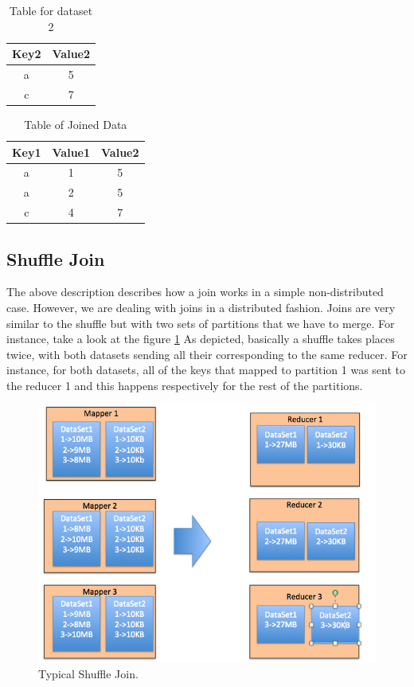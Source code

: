 \begin{table}[h!]
\centering
 \begin{tabular}{|c |c|}
  \hline
   Key2 & Value2 \\
  \hline
   a & 5 \\
  \hline
   c & 7 \\
  \hline
\end{tabular}
\caption{Table for dataset 2}
\label{table:join2}
\end{table}

\begin{table}[h!]
\centering
 \begin{tabular}{|c |c |c|}
  \hline
   Key1 & Value1 & Value2  \\
  \hline
   a & 1 & 5 \\
  \hline
   a & 2 & 5 \\
  \hline
   c & 4 & 7 \\
  \hline
\end{tabular}
\caption{Table of Joined Data}
\label{table:join3}
\end{table}

\subsection{Shuffle Join}
The above description describes how a join works in a simple non-distributed case. 
However, we are dealing with joins in a distributed fashion. Joins are very similar
to the shuffle but with two sets of partitions that we have to merge. 
For instance, take a look at the figure \ref{fig:shuffle_join}
As depicted, basically a shuffle takes places twice, with both datasets sending all their
corresponding to the same reducer. For instance, for both datasets, all of the keys that 
mapped to partition 1 was sent to the reducer 1 and this happens respectively for the rest of the partitions.

 \begin{figure}[h]
\begin{center}
\includegraphics[scale=1.0]{./img/shuffle_join.png}
\caption{Typical Shuffle Join.}
\label{fig:shuffle_join}
\end{center}
\end{figure}


